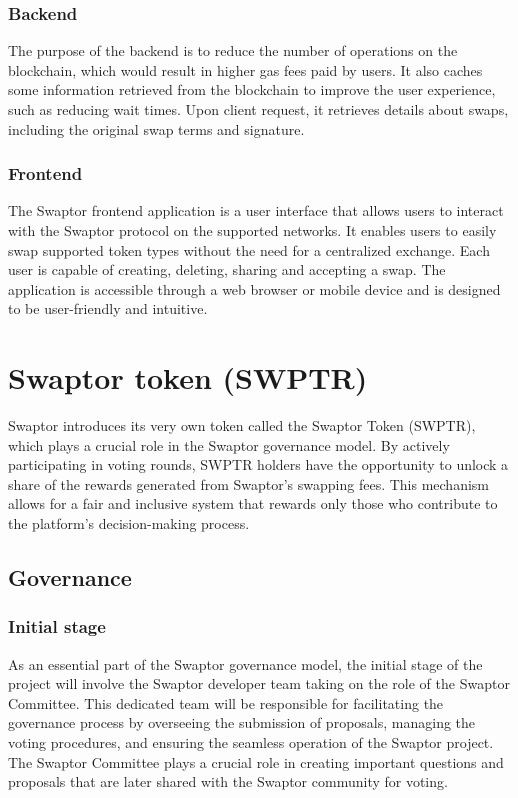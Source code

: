 \documentclass[12pt]{article}
\begin{document}
\subsubsection{Backend}
The purpose of the backend is to reduce the number of operations on the blockchain,
which would result in higher gas fees paid by users. It also caches some information
retrieved from the blockchain to improve the user experience, such as reducing wait
times. Upon client request, it retrieves details about swaps, including the original
swap terms and signature.

\subsubsection{Frontend}
The Swaptor frontend application is a user interface that allows users to interact
with the Swaptor protocol on the supported networks. It enables users to easily swap
supported token types without the need for a centralized exchange. Each user is capable
of creating, deleting, sharing and accepting a swap. The application is accessible through a
web browser or mobile device and is designed to be user-friendly and intuitive.

\section{Swaptor token (SWPTR)}

Swaptor introduces its very own token called the Swaptor Token (SWPTR), which plays a
crucial role in the Swaptor governance model. By actively participating in voting rounds,
SWPTR holders have the opportunity to unlock a share of the rewards generated from Swaptor's swapping fees.
This mechanism allows for a fair and inclusive system that rewards only those who contribute to the platform's decision-making process.

\subsection{Governance}

\subsubsection{Initial stage}
As an essential part of the Swaptor governance model, the initial stage of the project will
involve the Swaptor developer team taking on the role of the Swaptor Committee. This dedicated
team will be responsible for facilitating the governance process by overseeing the submission of proposals,
managing the voting procedures, and ensuring the seamless operation of the Swaptor project.
The Swaptor Committee plays a crucial role in creating important questions and proposals that are later shared
with the Swaptor community for voting.
\end{document}
